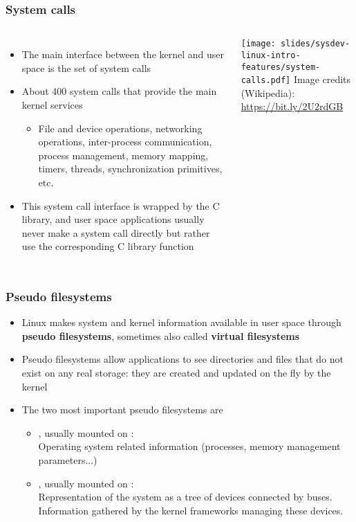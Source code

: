 \begin{frame}
  \frametitle{System calls}
  \begin{columns}
    \begin{itemize}
    \item The main interface between the kernel and user space is the set
      of system calls
    \item About 400 system calls that provide the main kernel services
      \begin{itemize}
      \item File and device operations, networking operations,
        inter-process communication, process management, memory mapping,
        timers, threads, synchronization primitives, etc.
      \end{itemize}
    \item This system call interface is wrapped by the C library, and
      user space applications usually never make a system call directly
      but rather use the corresponding C library function
    \end{itemize}
      \texttt{[image: slides/sysdev-linux-intro-features/system-calls.pdf]}
      \scriptsize
      Image credits (Wikipedia):\\
      \url{https://bit.ly/2U2rdGB}
    \end{columns}
\end{frame}

\begin{frame}
  \frametitle{Pseudo filesystems}
  \begin{itemize}
  \item Linux makes system and kernel information available in user
    space through {\bf pseudo filesystems}, sometimes also called {\bf
      virtual filesystems}
  \item Pseudo filesystems allow applications to see directories and
    files that do not exist on any real storage: they are created and
    updated on the fly by the kernel
  \item The two most important pseudo filesystems are
    \begin{itemize}
    \item {}, usually mounted on : \\
      Operating system related information (processes, memory
      management parameters...)
    \item {}, usually mounted on : \\
       Representation of the system as a tree of
       devices connected by buses. Information
       gathered by the kernel frameworks managing these devices.
    \end{itemize}
  \end{itemize}
\end{frame}
